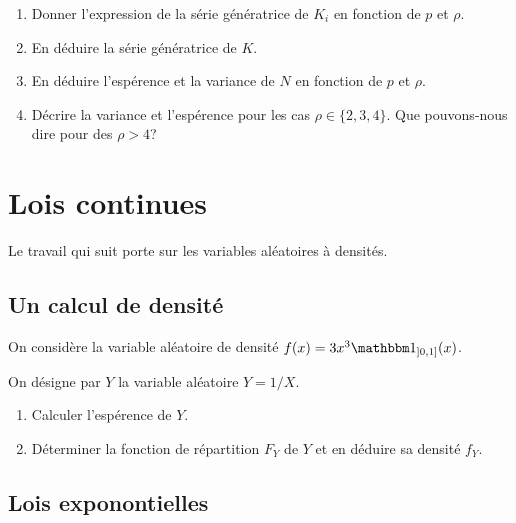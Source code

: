 \documentclass[11pt, a4paper]{article}
\begin{document}
\begin{question}{7}
  \begin{enumerate}
  \item Donner l'expression de la série génératrice de $K_i$ en
    fonction de $p$ et $\rho$.
  \item En déduire la série génératrice de $K$.
  \item En déduire l'espérence et la variance de $N$ en fonction de
    $p$ et $\rho$.
  \item Décrire la variance et l'espérence pour les cas
    $\rho \in \{2, 3, 4\}$. Que pouvons-nous dire pour des $\rho > 4$?
  \end{enumerate}
\end{question}

\section{Lois continues}

Le travail qui suit porte sur les variables aléatoires à densités.

\subsection{Un calcul de densité}

On considère la variable aléatoire de densité $f(x) = 3x^3\bOne_{]0,1]}(x)$.
\begin{question}{3}
  On désigne par $Y$ la variable aléatoire $Y = 1/X$.
  \begin{enumerate}
  \item Calculer l'espérence de $Y$.
  \item Déterminer la fonction de répartition $F_Y$ de $Y$ et en
    déduire sa densité $f_Y$.
  \end{enumerate}
\end{question}

\subsection{Lois exponontielles}
\end{document}

